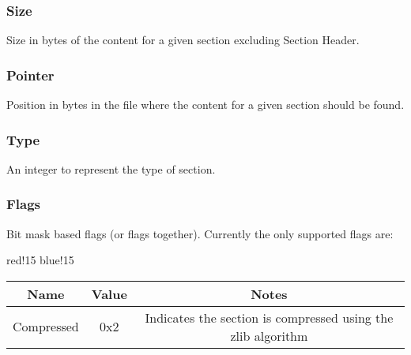 \subsubsection{Size}
Size in bytes of the content for a given section excluding Section Header.

\subsubsection{Pointer}
Position in bytes in the file where the content for a given section should be found.

\subsubsection{Type}
An integer to represent the type of section.

\subsubsection{Flags}
Bit mask based flags (or flags together). Currently the only supported flags are:
\begin{center}
    {
        {red!15}
        {blue!15}
        \begin{tabular}{|c|c|c|}
            \hline
            \textbf{Name} & \textbf{Value} & \textbf{Notes} \\
    
            \hline\hline
            Compressed & 0x2 & Indicates the section is compressed using the zlib \cite{zlib} algorithm \\
            \hline
        \end{tabular}
    }
\end{center}